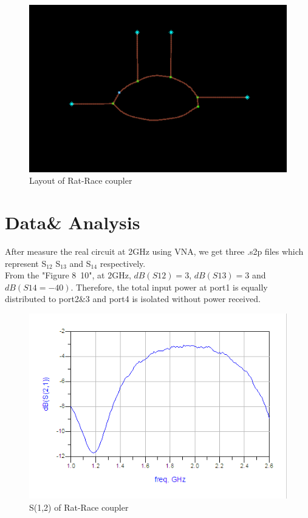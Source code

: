 \documentclass[11pt,a4paper]{report}
\begin{document}
\begin{figure}
\centering
\includegraphics[width=\textwidth]{final.png}
\caption{Layout of Rat-Race coupler}
\end{figure}

\section*{Data\& Analysis}

After measure the real circuit at 2GHz using VNA, we get three .s2p files which represent S\(_12\) S\(_13\) and S\(_14\) respectively. \\

From the "Figure 8~10", at 2GHz, \(dB(S12) = 3\), \(dB(S13) = 3\) and \(dB(S14 = -40)\). Therefore, the total input power at port1 is equally distributed to port2\&3 and port4 is isolated without power received.

\begin{figure}
\centering
\includegraphics[width=1.5\textwidth]{S12.png}
\caption{S(1,2) of Rat-Race coupler}
\end{figure}
\end{document}
